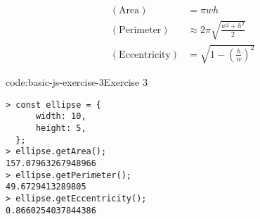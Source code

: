 $$ \begin{aligned}
    (\mathrm{Area}) &= \pi w h \\
    (\mathrm{Perimeter}) &\approx 2 \pi \sqrt{\frac{w^2 + h^2} 2} \\ 
    (\mathrm{Eccentricity}) &= \sqrt{1 - \left( \frac h w \right)^2}
\end{aligned} $$

\begin{codeenv}{code:basic-js-exercise-3}{Exercise 3}\begin{verbatim}
> const ellipse = {
      width: 10,
      height: 5,
  };
> ellipse.getArea();
157.07963267948966
> ellipse.getPerimeter();
49.6729413289805
> ellipse.getEccentricity();
0.8660254037844386
\end{verbatim}
\end{codeenv}
